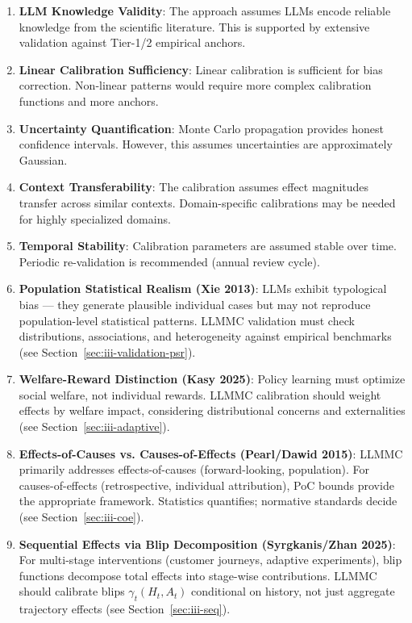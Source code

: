 \begin{enumerate}
\item \textbf{LLM Knowledge Validity}: The approach assumes LLMs encode reliable
knowledge from the scientific literature. This is supported by extensive validation
against Tier-1/2 empirical anchors.

\item \textbf{Linear Calibration Sufficiency}: Linear calibration is sufficient
for bias correction. Non-linear patterns would require more complex calibration
functions and more anchors.

\item \textbf{Uncertainty Quantification}: Monte Carlo propagation provides honest
confidence intervals. However, this assumes uncertainties are approximately Gaussian.

\item \textbf{Context Transferability}: The calibration assumes effect magnitudes
transfer across similar contexts. Domain-specific calibrations may be needed for
highly specialized domains.

\item \textbf{Temporal Stability}: Calibration parameters are assumed stable over
time. Periodic re-validation is recommended (annual review cycle).

\item \textbf{Population Statistical Realism (Xie 2013)}: LLMs exhibit typological
bias --- they generate plausible individual cases but may not reproduce population-level
statistical patterns. LLMMC validation must check distributions, associations, and
heterogeneity against empirical benchmarks (see Section~\ref{sec:iii-validation-psr}).

\item \textbf{Welfare-Reward Distinction (Kasy 2025)}: Policy learning must optimize
social welfare, not individual rewards. LLMMC calibration should weight effects by
welfare impact, considering distributional concerns and externalities
(see Section~\ref{sec:iii-adaptive}).

\item \textbf{Effects-of-Causes vs. Causes-of-Effects (Pearl/Dawid 2015)}: LLMMC
primarily addresses effects-of-causes (forward-looking, population). For causes-of-effects
(retrospective, individual attribution), PoC bounds provide the appropriate framework.
Statistics quantifies; normative standards decide (see Section~\ref{sec:iii-coe}).

\item \textbf{Sequential Effects via Blip Decomposition (Syrgkanis/Zhan 2025)}: For
multi-stage interventions (customer journeys, adaptive experiments), blip functions
decompose total effects into stage-wise contributions. LLMMC should calibrate blips
$\gamma_t(H_t, A_t)$ conditional on history, not just aggregate trajectory effects
(see Section~\ref{sec:iii-seq}).
\end{enumerate}

